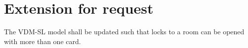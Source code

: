 \documentclass[Main]{subfiles}
\begin{document}
\section{Extension for request}

The VDM-SL model shall be updated such that locks to a room can be opened with more than one card.
\end{document}
